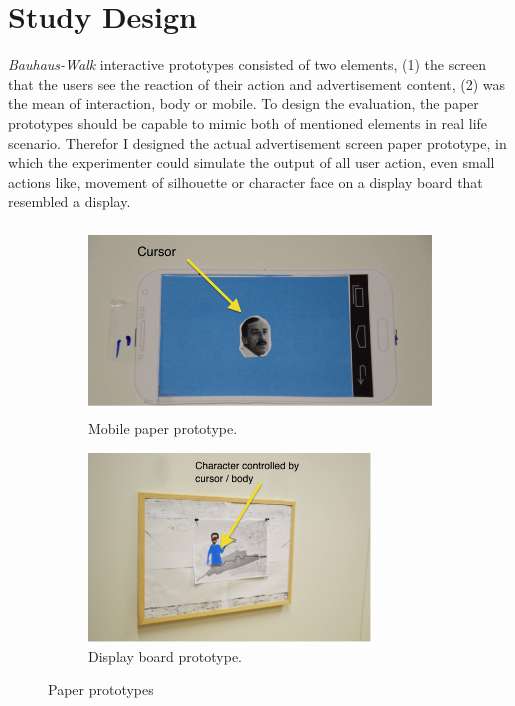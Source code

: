 \section{Study Design}
\emph{Bauhaus-Walk} interactive prototypes consisted of two elements, (1) the screen that the users see the reaction of their action and advertisement content, (2) was the mean of interaction, body or mobile. To design the evaluation, the paper prototypes should be capable to mimic both of mentioned elements in real life scenario. Therefor I designed the actual advertisement screen paper prototype, in which the experimenter could simulate the output of all user action, even small actions like, movement of silhouette or character face on a display board that resembled a display.

\begin{figure}[H]
    \centering
    \begin{subfigure}[H]{0.48\textwidth}
        \centering
        \includegraphics[width=\textwidth,height=5cm]{Figures/5/mobile_paper}
        \caption{Mobile paper prototype.}
        \label{fig:mobileproto}
    \end{subfigure}
    \begin{subfigure}[H]{0.48\textwidth}
        \centering
        \includegraphics[width=\textwidth,height=5cm]{Figures/5/paper_board}
        \caption{Display board prototype.}
        \label{fig:screen_proto}
    \end{subfigure}
    \caption{Paper prototypes}
    \label{fig:paper_prototype_screen}
\end{figure}


